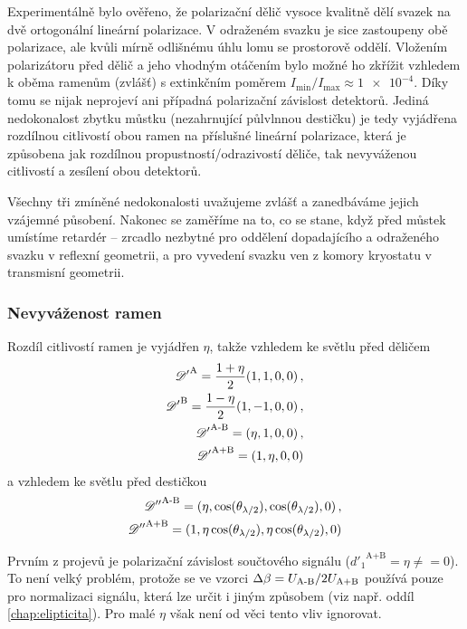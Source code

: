 Experimentálně bylo ověřeno, že polarizační dělič vysoce kvalitně dělí svazek na dvě ortogonální lineární polarizace.
V odraženém svazku je sice zastoupeny obě polarizace, ale kvůli mírně odlišnému úhlu lomu se prostorově oddělí.
Vložením polarizátoru před dělič a jeho vhodným otáčením bylo možné ho zkřížit vzhledem k oběma ramenům (zvlášť) s extinkčním poměrem $I_\textrm{min}/I_\textrm{max} \approx \num{1e-4}$.
Díky tomu se nijak neprojeví ani případná polarizační závislost detektorů.
Jediná nedokonalost zbytku můstku (nezahrnující půlvlnnou destičku) je tedy vyjádřena rozdílnou citlivostí obou ramen na příslušné lineární polarizace, která je způsobena jak rozdílnou propustností/odrazivostí děliče, tak nevyváženou citlivostí a zesílení obou detektorů.

Všechny tři zmíněné nedokonalosti uvažujeme zvlášť a zanedbáváme jejich vzájemné působení.
Nakonec se zaměříme na to, co se stane, když před můstek umístíme retardér -- zrcadlo nezbytné pro oddělení dopadajícího a odraženého svazku v reflexní geometrii, a pro vyvedení svazku ven z komory kryostatu v transmisní geometrii.


\subsubsection*{Nevyváženost ramen}
Rozdíl citlivostí ramen je vyjádřen $\eta$, takže vzhledem ke světlu před děličem
\begin{align}
    {\mathscr{D}'}^\textrm{A}=\frac{1+\eta}{2}(1, 1, 0, 0) \,,\\
    {\mathscr{D}'}^\textrm{B}=\frac{1-\eta}{2}(1, -1, 0, 0) \,,\\
    {\mathscr{D}'}^\textrm{A-B}=(\eta, 1, 0, 0) \,,\\
    {\mathscr{D}'}^\textrm{A+B}=(1, \eta, 0, 0) 
\end{align}
a vzhledem ke světlu před destičkou
\begin{align}
    {\mathscr{D}''}^\textrm{A-B}=(\eta, \cos(\theta_{\lambda/2}), \cos(\theta_{\lambda/2}), 0) \,,\\
    {\mathscr{D}''}^\textrm{A+B}=(1, \eta\cos(\theta_{\lambda/2}), \eta\cos(\theta_{\lambda/2}), 0) 
\end{align}

Prvním z projevů je polarizační závislost součtového signálu (${d'_1}^\textrm{A+B}=\eta\neq=0$).
To není velký problém, protože se ve vzorci $\Delta\beta=U_\textrm{A-B}/2U_\textrm{A+B}$ používá pouze pro normalizaci signálu, která lze určit i jiným způsobem (viz např. oddíl \ref{chap:elipticita}). 
Pro malé $\eta$ však není od věci tento vliv ignorovat.

